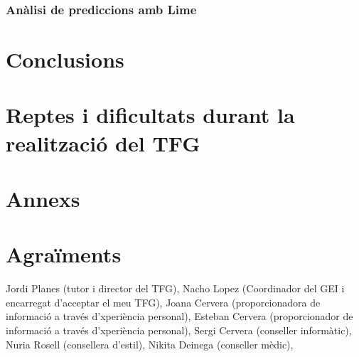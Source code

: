 \documentclass[a4paper,12pt]{article}
\begin{document}
\subsubsection*{Anàlisi de prediccions amb Lime}

\section*{Conclusions}

\section*{Reptes i dificultats durant la realització del TFG}

\section*{Annexs}

\section*{Agraïments}
Jordi Planes (tutor i director del TFG), Nacho Lopez (Coordinador del GEI i encarregat d'acceptar el meu TFG), Joana Cervera (proporcionadora de informació a través d'xperiència personal), Esteban Cervera (proporcionador de informació a través d'xperiència personal), Sergi Cervera (conseller informàtic), Nuria Rosell (consellera d'estil), Nikita Deinega (conseller mèdic), 
\end{document}
